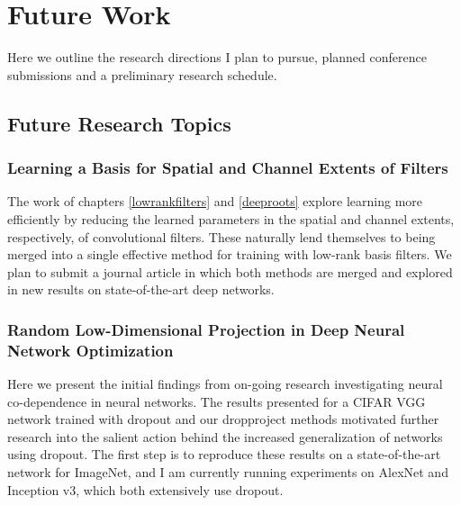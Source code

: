 \documentclass[thesis]{subfiles}
\begin{document}

\chapter{Future Work}  %
\label{futurework}


Here we outline the research directions I plan to pursue, planned conference submissions and a preliminary research schedule.

\section{Future Research Topics}

\subsection{Learning a Basis for Spatial and Channel Extents of Filters}
\label{journalplan}
The work of chapters \ref{lowrankfilters} and \ref{deeproots} explore learning more efficiently by reducing the learned parameters in the spatial and channel extents, respectively, of convolutional filters. These naturally lend themselves to being merged into a single effective method for training with low-rank basis filters. We plan to submit a journal article in which both methods are merged and explored in new results on state-of-the-art deep networks.

\subsection{Random Low-Dimensional Projection in Deep Neural Network Optimization}
\label{pairablation}
Here we present the initial findings from on-going research investigating neural co-dependence in neural networks. The results presented for a CIFAR VGG network trained with dropout and our dropproject methods motivated further research into the salient action behind the increased generalization of networks using dropout. The first step is to reproduce these results on a state-of-the-art network for ImageNet, and I am currently running experiments on AlexNet and Inception v3, which both extensively use dropout.
\end{document}
